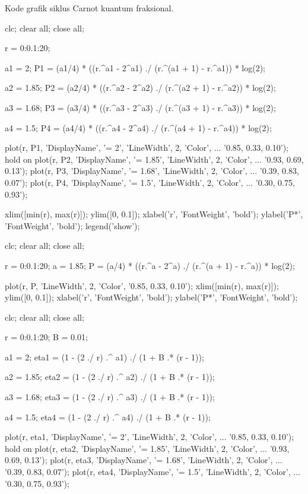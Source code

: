 Kode grafik siklus Carnot kuantum fraksional.
\begin{verbatim*}
clc; clear all; close all;

r = 0:0.1:20;

a1 = 2;
P1 = (a1/4) * ((r.^a1 - 2^a1) ./ (r.^(a1 + 1) - r.^a1)) * log(2);

a2 = 1.85;
P2 = (a2/4) * ((r.^a2 - 2^a2) ./ (r.^(a2 + 1) - r.^a2)) * log(2);

a3 = 1.68;
P3 = (a3/4) * ((r.^a3 - 2^a3) ./ (r.^(a3 + 1) - r.^a3)) * log(2);

a4 = 1.5;
P4 = (a4/4) * ((r.^a4 - 2^a4) ./ (r.^(a4 + 1) - r.^a4)) * log(2);

plot(r, P1, 'DisplayName', '\alpha = 2', 'LineWidth', 2, 'Color', ...
    '0.85, 0.33, 0.10');
hold on
plot(r, P2, 'DisplayName', '\alpha = 1.85', 'LineWidth', 2, 'Color', ...
    '0.93, 0.69, 0.13');
plot(r, P3, 'DisplayName', '\alpha = 1.68', 'LineWidth', 2, 'Color', ...
    '0.39, 0.83, 0.07');
plot(r, P4, 'DisplayName', '\alpha = 1.5', 'LineWidth', 2, 'Color', ...
    '0.30, 0.75, 0.93');

xlim([min(r), max(r)]);
ylim([0, 0.1]);
xlabel('r', 'FontWeight', 'bold');
ylabel('P*', 'FontWeight', 'bold');
legend('show');

clc; clear all; close all;

r = 0:0.1:20;
a = 1.85;
P = (a/4) * ((r.^a - 2^a) ./ (r.^(a + 1) - r.^a)) * log(2);

plot(r, P, 'LineWidth', 2, 'Color', '0.85, 0.33, 0.10');
xlim([min(r), max(r)]);
ylim([0, 0.1]);
xlabel('r', 'FontWeight', 'bold');
ylabel('P*', 'FontWeight', 'bold');

clc; clear all; close all;

r = 0:0.1:20;
B = 0.01;

a1 = 2;
eta1 = (1 - (2 ./ r) .^ a1) ./ (1 + B .* (r - 1));

a2 = 1.85;
eta2 = (1 - (2 ./ r) .^ a2) ./ (1 + B .* (r - 1));

a3 = 1.68;
eta3 = (1 - (2 ./ r) .^ a3) ./ (1 + B .* (r - 1));

a4 = 1.5;
eta4 = (1 - (2 ./ r) .^ a4) ./ (1 + B .* (r - 1));

plot(r, eta1, 'DisplayName', '\alpha = 2', 'LineWidth', 2, 'Color', ...
    '0.85, 0.33, 0.10');
hold on
plot(r, eta2, 'DisplayName', '\alpha = 1.85', 'LineWidth', 2, 'Color', ...
    '0.93, 0.69, 0.13');
plot(r, eta3, 'DisplayName', '\alpha = 1.68', 'LineWidth', 2, 'Color', ...
    '0.39, 0.83, 0.07');
plot(r, eta4, 'DisplayName', '\alpha = 1.5', 'LineWidth', 2, 'Color', ...
    '0.30, 0.75, 0.93');


\end{verbatim*}
